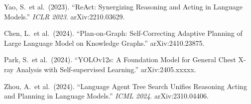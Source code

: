 \documentclass[11pt,a4paper]{article}
\begin{document}
\begin{enumerate}[leftmargin=1.5em, label={[\arabic*]}]
  \item Yao, S.\ et al.\ (2023). ``ReAct: Synergizing Reasoning and Acting in Language Models.'' \textit{ICLR 2023}. arXiv:2210.03629.

  \item Chen, L.\ et al.\ (2024). ``Plan-on-Graph: Self-Correcting Adaptive Planning of Large Language Model on Knowledge Graphs.'' arXiv:2410.23875.

  \item Park, S.\ et al.\ (2024). ``YOLOv12s: A Foundation Model for General Chest X-ray Analysis with Self-supervised Learning.'' arXiv:2405.xxxxx.

  \item Zhou, A.\ et al.\ (2024). ``Language Agent Tree Search Unifies Reasoning Acting and Planning in Language Models.'' \textit{ICML 2024}. arXiv:2310.04406.
\end{enumerate}
\end{document}
